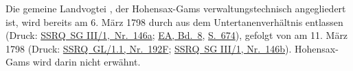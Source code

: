 \documentclass[10pt,twoside]{article}
\begin{document}
\begin{introlist}
{         
}
         \item {Die gemeine Landvogtei , der Hohensax-Gams
               verwaltungstechnisch angegliedert ist, wird bereits am 6.
                  März 1798 durch  aus dem
               Untertanenverhältnis entlassen (Druck: \href{https://www.ssrq-sds-fds.ch/online/SG_III_1/index.html\#p_241}{SSRQ SG III/1, Nr. 146a}; \href{                         http://permalink.snl.ch/bib/chbsg000143823}{EA,
                        Bd. 8}, \href{http://digital.ub.uni-duesseldorf.de/periodical/pageview/1387096}{S. 674}), gefolgt von  am 11. März 1798 (Druck:
                     \href{https://www.ssrq-sds-fds.ch/online/GL_1.1/index.html\#p_519}{SSRQ GL/1.1, Nr. 192F}; \href{https://www.ssrq-sds-fds.ch/online/SG_III_1/index.html\#p_242}{SSRQ SG III/1, Nr. 146b}). Hohensax-Gams wird darin
               nicht erwähnt. 


}
      
\end{introlist}
\end{document}
